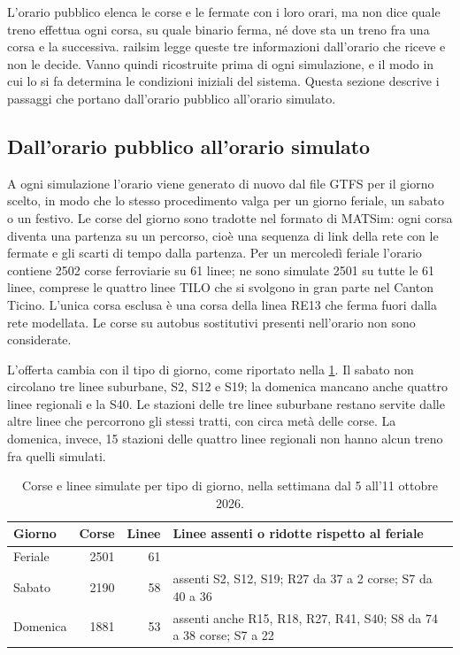 L'orario pubblico elenca le corse e le fermate con i loro orari, ma non dice quale treno effettua ogni corsa, su quale binario ferma, né dove sta un treno fra una corsa e la successiva. railsim legge queste tre informazioni dall'orario che riceve e non le decide. Vanno quindi ricostruite prima di ogni simulazione, e il modo in cui lo si fa determina le condizioni iniziali del sistema. Questa sezione descrive i passaggi che portano dall'orario pubblico all'orario simulato.

\subsection{Dall'orario pubblico all'orario simulato}
A ogni simulazione l'orario viene generato di nuovo dal file GTFS per il giorno scelto, in modo che lo stesso procedimento valga per un giorno feriale, un sabato o un festivo. Le corse del giorno sono tradotte nel formato di MATSim: ogni corsa diventa una partenza su un percorso, cioè una sequenza di link della rete con le fermate e gli scarti di tempo dalla partenza. Per un mercoledì feriale l'orario contiene 2502 corse ferroviarie su 61 linee; ne sono simulate 2501 su tutte le 61 linee, comprese le quattro linee TILO che si svolgono in gran parte nel Canton Ticino. L'unica corsa esclusa è una corsa della linea RE13 che ferma fuori dalla rete modellata. Le corse su autobus sostitutivi presenti nell'orario non sono considerate.

L'offerta cambia con il tipo di giorno, come riportato nella \cref{tab:orari-giorni}. Il sabato non circolano tre linee suburbane, S2, S12 e S19; la domenica mancano anche quattro linee regionali e la S40. Le stazioni delle tre linee suburbane restano servite dalle altre linee che percorrono gli stessi tratti, con circa metà delle corse. La domenica, invece, 15 stazioni delle quattro linee regionali non hanno alcun treno fra quelli simulati.

\begin{table}[H]
	\centering
	\caption{Corse e linee simulate per tipo di giorno, nella settimana dal 5 all'11 ottobre 2026.}
	\label{tab:orari-giorni}
	\begin{tabularx}{\textwidth}{lrr>{\raggedright\arraybackslash}X}
		\toprule
		Giorno & Corse & Linee & Linee assenti o ridotte rispetto al feriale \\
		\midrule
		Feriale & 2501 & 61 & \\
		Sabato & 2190 & 58 & assenti S2, S12, S19; R27 da 37 a 2 corse; S7 da 40 a 36 \\
		Domenica & 1881 & 53 & assenti anche R15, R18, R27, R41, S40; S8 da 74 a 38 corse; S7 a 22 \\
		\bottomrule
	\end{tabularx}
\end{table}

